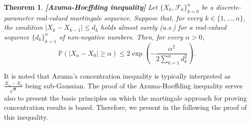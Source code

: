 \documentclass[12pt, oneside, a4paper]{article}
\theoremstyle{plain}
\newtheorem{thm}{Theorem}[section]
\theoremstyle{definition}
\def\pr{\ensuremath{\mathbb{P}}}
\begin{document}
\begin{thm}{\bf[Azuma-Hoeffding inequality]}
Let $\{X_k, \mathcal{F}_k\}_{k=0}^n$
be a discrete-parameter real-valued martingale sequence.
Suppose that, for every $k \in \{1, \ldots, n\}$, the condition
$ |X_k - X_{k-1}| \leq d_k$
holds almost surely (a.s.) for a real-valued sequence $\{d_k\}_{k=1}^n$ of
non-negative numbers. Then, for every $\alpha > 0$,
\begin{equation}
\pr( | X_n - X_0 | \geq \alpha) \leq 2 \exp\left(-\frac{\alpha^2}{2
\sum_{k=1}^n d_k^2}\right).
\label{eq: Azuma's concentration inequality - general case}
\end{equation}
\label{theorem: Azuma's concentration inequality}
\end{thm}

It is noted that Azuma's concentration inequality
is typically interpreted as $\frac{X_n - X_0}{\sqrt{n}}$ being sub-Gaussian.
The proof of the Azuma-Hoeffding inequality serves also
to present the basic principles on which the martingale
approach for proving concentration results is based.
Therefore, we present in the following the proof of this
inequality.
\end{document}
